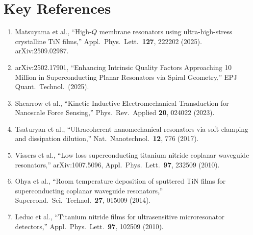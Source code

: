 \documentclass[11pt]{article}
\theoremstyle{remark}
\begin{document}
\section{Key References}
\label{sec:refs}

\begin{enumerate}[nosep]
  \item Matsuyama et al., ``High-$Q$ membrane resonators using
    ultra-high-stress crystalline TiN films,''
    Appl.\ Phys.\ Lett.\ \textbf{127}, 222202 (2025).
    arXiv:2509.02987.
  \item arXiv:2502.17901, ``Enhancing Intrinsic Quality Factors
    Approaching 10 Million in Superconducting Planar Resonators
    via Spiral Geometry,'' EPJ Quant.\ Technol.\ (2025).
  \item Shearrow et al., ``Kinetic Inductive Electromechanical
    Transduction for Nanoscale Force Sensing,''
    Phys.\ Rev.\ Applied \textbf{20}, 024022 (2023).
  \item Tsaturyan et al., ``Ultracoherent nanomechanical resonators
    via soft clamping and dissipation dilution,''
    Nat.\ Nanotechnol.\ \textbf{12}, 776 (2017).
  \item Vissers et al., ``Low loss superconducting titanium nitride
    coplanar waveguide resonators,'' arXiv:1007.5096,
    Appl.\ Phys.\ Lett.\ \textbf{97}, 232509 (2010).
  \item Ohya et al., ``Room temperature deposition of sputtered TiN
    films for superconducting coplanar waveguide resonators,''
    Supercond.\ Sci.\ Technol.\ \textbf{27}, 015009 (2014).
  \item Leduc et al., ``Titanium nitride films for ultrasensitive
    microresonator detectors,''
    Appl.\ Phys.\ Lett.\ \textbf{97}, 102509 (2010).
\end{enumerate}
\end{document}
